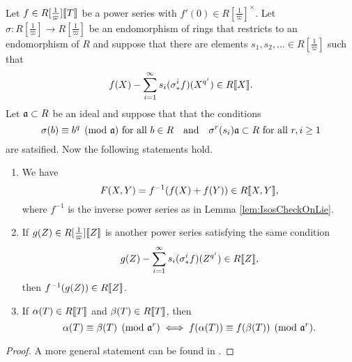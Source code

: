 \documentclass[../main.tex]{subfiles}
\begin{document}
\begin{thm}\label{thm:HazewinkelIntegrality}
  Let $f \in R[\tfrac 1\varpi]\llbracket T \rrbracket$ be a 
  power series with $f'(0) \in R[\tfrac 1\varpi]^\times$. Let 
  $\sigma\colon  R[\tfrac 1\varpi] \to R[\tfrac 1\varpi]$ be an endomorphism
  of rings that restricts to an endomorphism of $R$ and suppose that 
  there are elements $s_1, s_2, \dots \in R[\tfrac 1\varpi]$ such that
  \begin{equation*}
    f(X) - \sum_{i=1}^\infty s_i (\sigma^i_* f)(X^{q^i}) \in R\llbracket X \rrbracket.
  \end{equation*}
  Let $\mathfrak{a} \subset R$ be an ideal and suppose that that the conditions
  \begin{equation*}
    \sigma(b) \equiv b^q \pmod {\mathfrak{a}} \text{ for all } b \in R \quad \text{and} \quad 
    \sigma^r(s_i) \mathfrak{a} \subset R \text{ for all } r,i \geq 1
  \end{equation*}
  are satsified. Now the following statements hold.
  \begin{enumerate}
    \item We have 
        \begin{equation*}
          F(X,Y) = f^{-1}(f(X) + f(Y)) \in R \llbracket X,Y \rrbracket,
        \end{equation*}
        where $f^{-1}$ is the inverse power series as in Lemma \ref{lem:IsosCheckOnLie}.
    \item If $g(Z) \in R[\tfrac 1\varpi]\llbracket Z \rrbracket$ is another power series
        satisfying the same condition
        \begin{equation*}
          g(Z) - \sum_{i=1}^\infty s_i (\sigma^i_* f)(Z^{q^i}) \in R\llbracket Z \rrbracket,
        \end{equation*}
        then $f^{-1}(g(Z)) \in R\llbracket Z \rrbracket$. 
    \item If $\alpha(T) \in R\llbracket T \rrbracket$ and $\beta(T) \in R \llbracket T \rrbracket$, then
        \begin{equation} \label{eq:funceqlemcongruence}
          \alpha(T) \equiv \beta(T) \pmod {\mathfrak{a}^r} \iff f(\alpha(T)) \equiv f(\beta(T))
          \pmod {\mathfrak{a}^r}.
        \end{equation}
  \end{enumerate}
\end{thm}
  \begin{proof}
    A more general statement can be found in \cite[s 2 and
    10]{hazewinkel1978formal}.
  \end{proof}
\end{document}
